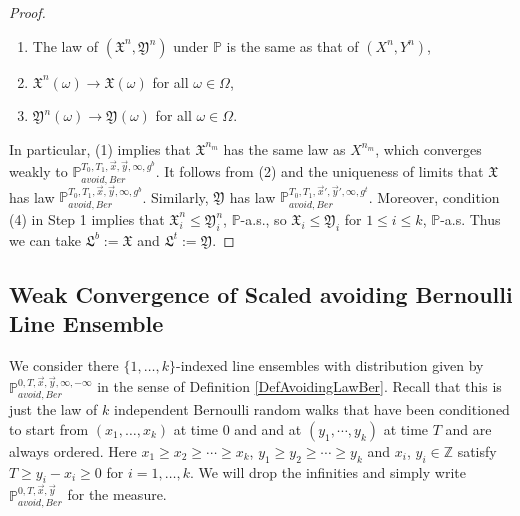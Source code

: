 \begin{proof}
\begin{enumerate}[label=(\arabic*)]
		\item The law of $(\mathfrak{X}^n,\mathfrak{Y}^n)$ under $\mathbb{P}$ is the same as that of $(X^n,Y^n)$,
		
		\item $\mathfrak{X}^n(\omega) \longrightarrow \mathfrak{X}(\omega)$ for all $\omega\in\Omega$,
		
		\item $\mathfrak{Y}^n(\omega) \longrightarrow \mathfrak{Y}(\omega)$ for all $\omega\in\Omega$.
		
	\end{enumerate}
	
	In particular, (1) implies that $\mathfrak{X}^{n_m}$ has the same law as $X^{n_m}$, which converges weakly to $\mathbb{P}_{avoid,Ber}^{T_0,T_1,\vec{x},\vec{y},\infty,g^b}$. It follows from (2) and the uniqueness of limits that $\mathfrak{X}$ has law $\mathbb{P}_{avoid,Ber}^{T_0,T_1,\vec{x},\vec{y},\infty,g^b}$. Similarly, $\mathfrak{Y}$ has law $\mathbb{P}_{avoid,Ber}^{T_0,T_1,\vec{x}',\vec{y}',\infty,g^t}$. Moreover, condition (4) in Step 1 implies that $\mathfrak{X}^n_i \leq \mathfrak{Y}^n_i$, $\mathbb{P}$-a.s., so $\mathfrak{X}_i \leq \mathfrak{Y}_i$ for $1\leq i\leq k$, $\mathbb{P}$-a.s. Thus we can take $\mathfrak{L}^b := \mathfrak{X}$ and $\mathfrak{L}^t := \mathfrak{Y}$.
	
\end{proof}

\subsection{Weak Convergence of Scaled avoiding Bernoulli Line Ensemble} We consider there $\{1,\dots,k\}$-indexed line ensembles with distribution given by $\mathbb{P}^{0,T,\vec{x},\vec{y},\infty,-\infty}_{avoid,Ber}$ in the sense of Definition \ref{DefAvoidingLawBer}. Recall that this is just the law of $k$ independent Bernoulli random walks that have been conditioned to start from $(x_{1},\dots,x_{k})$ at time $0$ and and at $(y_1,\cdots,y_{k})$ at time $T$ and are always ordered. Here $x_{1}\geq x_{2}\geq \cdots \geq x_{k}$, $y_{1}\geq y_{2}\geq \cdots \geq y_{k}$ and $x_{i}$, $y_{i}\in\mathbb{Z}$ satisfy $T\geq y_{i}-x_{i}\geq 0$ for $i=1,\dots,k$. We will drop the infinities and simply write $\mathbb{P}^{0,T,\vec{x},\vec{y}}_{avoid,Ber}$ for the measure.


